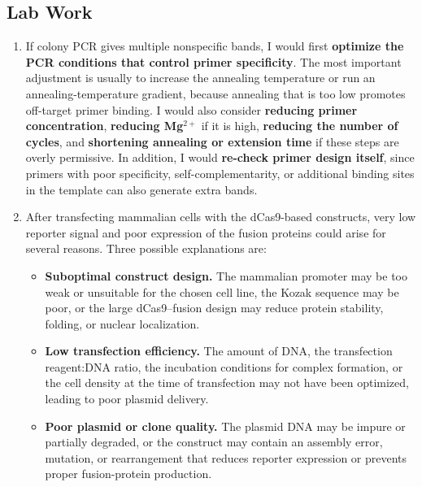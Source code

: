 \documentclass[12pt,a4paper]{article}
\begin{document}
\subsection{Lab Work}
\begin{enumerate}[parsep=0.5\baselineskip]
  \item If colony PCR gives multiple nonspecific bands, I would first \textbf{optimize the PCR conditions that control primer specificity}. The most important adjustment is usually to increase the annealing temperature or run an annealing-temperature gradient, because annealing that is too low promotes off-target primer binding. I would also consider \textbf{reducing primer concentration}, \textbf{reducing Mg$^{2+}$} if it is high, \textbf{reducing the number of cycles}, and \textbf{shortening annealing or extension time} if these steps are overly permissive. In addition, I would \textbf{re-check primer design itself}, since primers with poor specificity, self-complementarity, or additional binding sites in the template can also generate extra bands. 

  \item After transfecting mammalian cells with the dCas9-based constructs, very low reporter signal and poor expression of the fusion proteins could arise for several reasons. Three possible explanations are:
  \begin{itemize}
    \item \textbf{Suboptimal construct design.} The mammalian promoter may be too weak or unsuitable for the chosen cell line, the Kozak sequence may be poor, or the large dCas9--fusion design may reduce protein stability, folding, or nuclear localization.
    \item \textbf{Low transfection efficiency.} The amount of DNA, the transfection reagent:DNA ratio, the incubation conditions for complex formation, or the cell density at the time of transfection may not have been optimized, leading to poor plasmid delivery.
    \item \textbf{Poor plasmid or clone quality.} The plasmid DNA may be impure or partially degraded, or the construct may contain an assembly error, mutation, or rearrangement that reduces reporter expression or prevents proper fusion-protein production.
  \end{itemize}
\end{enumerate}
\end{document}
